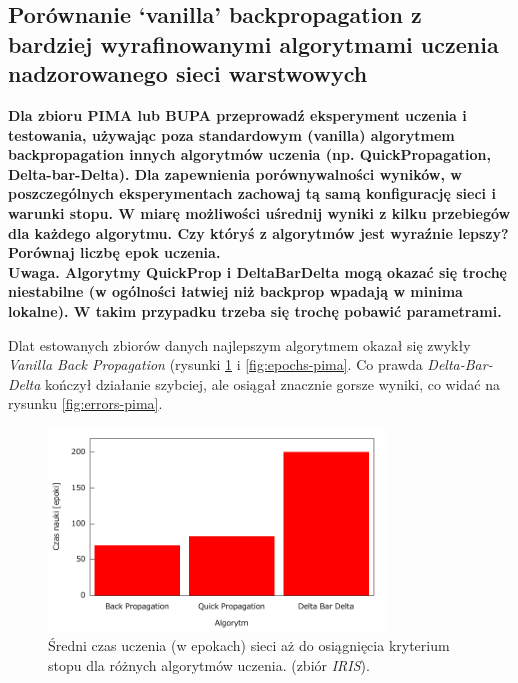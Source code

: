 \subsection{Porównanie ‘vanilla’ backpropagation z bardziej wyrafinowanymi algorytmami uczenia nadzorowanego sieci warstwowych}
\textbf{Dla zbioru PIMA lub BUPA przeprowadź eksperyment uczenia i testowania, używając poza standardowym (vanilla) algorytmem backpropagation innych algorytmów uczenia (np. QuickPropagation, Delta-bar-Delta). Dla zapewnienia porównywalności wyników, w poszczególnych eksperymentach zachowaj tą samą konfigurację sieci i warunki stopu. W miarę możliwości uśrednij wyniki z kilku przebiegów dla każdego algorytmu. Czy któryś z algorytmów jest wyraźnie lepszy? Porównaj liczbę epok uczenia.
\\
Uwaga. Algorytmy QuickProp i DeltaBarDelta mogą okazać się trochę niestabilne (w ogólności łatwiej niż backprop wpadają w minima lokalne). W takim przypadku trzeba się trochę pobawić parametrami.}

Dlat estowanych zbiorów danych najlepszym algorytmem okazał się zwykły \emph{\textit{Vanilla} Back Propagation} (rysunki \ref{fig:epochs-iris} i \ref{fig:epochs-pima}. Co prawda \emph{Delta-Bar-Delta} kończył działanie szybciej, ale osiągał znacznie gorsze wyniki, co widać na rysunku \ref{fig:errors-pima}.


\begin{figure}[h]
\centering
\includegraphics[width=0.8\textwidth]{dane/part1/zad10/epochs-iris}
\caption{Średni czas uczenia (w epokach) sieci aż do osiągnięcia kryterium stopu dla różnych algorytmów uczenia. (zbiór \emph {IRIS}).\label{fig:epochs-iris}}
\end{figure}


